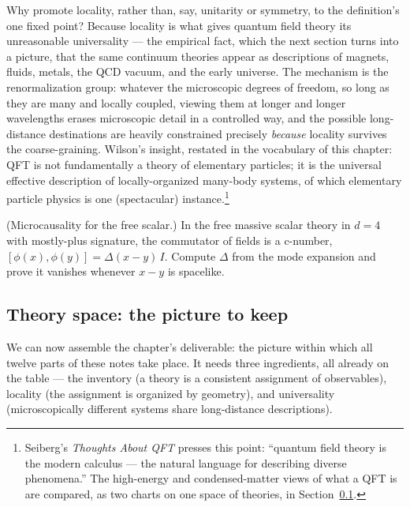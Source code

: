 Why promote locality, rather than, say, unitarity or symmetry, to the
definition's one fixed point? Because locality is what gives quantum field
theory its unreasonable universality --- the empirical fact, which the next
section turns into a picture, that the same continuum theories appear as
descriptions of magnets, fluids, metals, the QCD vacuum, and the early universe.
The mechanism is the renormalization group: whatever the microscopic degrees of
freedom, so long as they are many and locally coupled, viewing them at longer
and longer wavelengths erases microscopic detail in a controlled way, and the
possible long-distance destinations are heavily constrained precisely
\emph{because} locality survives the coarse-graining. Wilson's insight, restated
in the vocabulary of this chapter: QFT is not fundamentally a theory of
elementary particles; it is the universal effective description of
locally-organized many-body systems, of which elementary particle physics is one
(spectacular) instance.\footnote{Seiberg's \emph{Thoughts About QFT} presses
this point: ``quantum field theory is the modern calculus --- the natural
language for describing diverse phenomena.'' The high-energy and
condensed-matter views of what a QFT is are compared, as two charts on one space
of theories, in Section~\ref{sec:theory-space}.}

\begin{exercise}[classic]
\label{exr:microcausality}
(Microcausality for the free scalar.) In the free massive scalar theory in $d=4$
with mostly-plus signature, the commutator of fields is a c-number, $[\phi(x),
\phi(y)] = \Delta(x-y)\,I$. Compute $\Delta$ from the mode expansion
and prove it vanishes whenever $x - y$ is spacelike.
\end{exercise}

\subsection{Theory space: the picture to keep}
\label{sec:theory-space}

We can now assemble the chapter's deliverable: the picture within which all
twelve parts of these notes take place. It needs three ingredients, all already
on the table --- the inventory (a theory is a consistent assignment of
observables), locality (the assignment is organized by geometry), and
universality (microscopically different systems share long-distance
descriptions).

